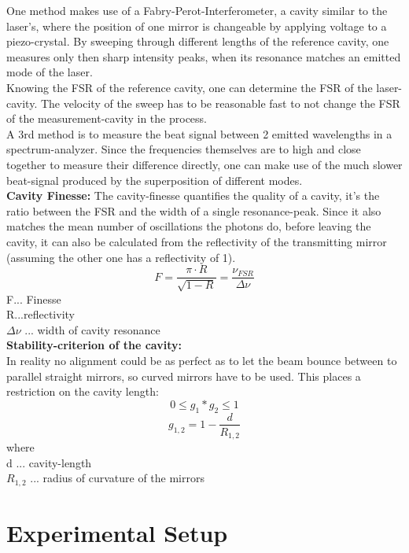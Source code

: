 \documentclass[12pt,a4paper]{article}
\begin{document}
\begin{multicols}{2}
\noindent One method makes use of a Fabry-Perot-Interferometer, a cavity similar to the laser's, where the position of one mirror is changeable by applying voltage to a piezo-crystal. By sweeping through different lengths of the reference cavity, one measures only then sharp intensity peaks, when its resonance matches an emitted mode of the laser.\\
Knowing the FSR of the reference cavity, one can determine the FSR of the laser-cavity. The velocity of the sweep has to be reasonable fast to not change the FSR of the measurement-cavity in the process.\\

\noindent A 3rd method is to measure the beat signal between 2 emitted wavelengths in a spectrum-analyzer. Since the frequencies themselves are to high and close together to measure their difference directly, one can make use of the much slower beat-signal produced by the superposition of different modes.\\

\noindent \textbf{Cavity Finesse:}
The cavity-finesse quantifies the quality of a cavity, it's the ratio between the FSR and the width of a single resonance-peak. Since it also matches the mean number of oscillations the photons do, before leaving the cavity, it can also be calculated from the reflectivity of the transmitting mirror (assuming the other one has a reflectivity of 1).
$$F = \frac{\pi \cdot R}{\sqrt{1 - R}} = \frac{\nu_{FSR}}{\Delta \nu}$$
F... Finesse\\
R...reflectivity\\
$\Delta \nu$ ... width of cavity resonance\\

\noindent \textbf{Stability-criterion of the cavity:}\\
In reality no alignment could be as perfect as to let the beam bounce between to parallel straight mirrors, so curved mirrors have to be used. This places a restriction on the cavity length:
$$0 \le g_1*g_2 \le 1$$
$$g_{1,2} = 1 - \frac{d}{R_{1,2}}$$
where\\
d ... cavity-length\\
$R_{1,2}$ ... radius of curvature of the mirrors\\

\section{Experimental Setup}

\end{multicols}
\end{document}
